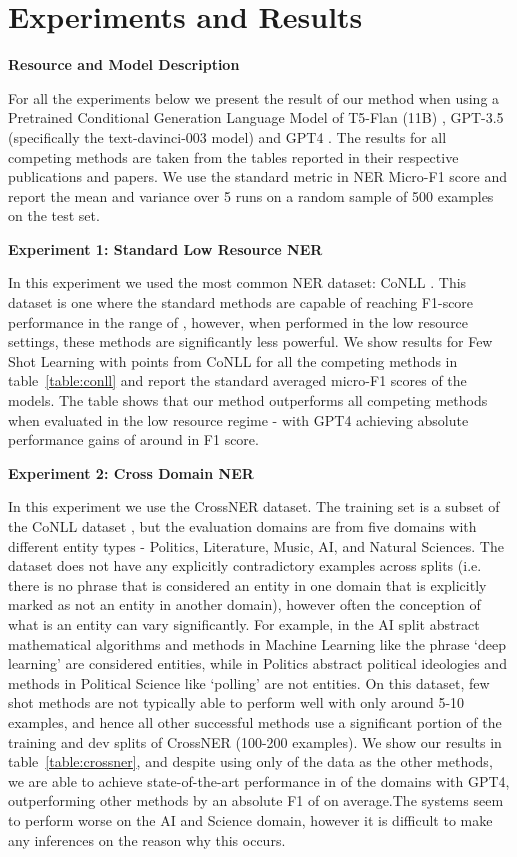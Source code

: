 \documentclass[11pt]{article}
\begin{document}
\section{Experiments and Results}

\noindent\textbf{Resource and Model Description}

For all the experiments below we present the result of our method when using a Pretrained Conditional Generation Language Model of T5-Flan (11B) \citep{chung2022scaling}, GPT-3.5 
 \citep{brown2020language} (specifically the text-davinci-003 model) and GPT4 \citep{openai2023gpt4}. The results for all competing methods are taken from the tables reported in their respective publications and papers. We use the standard metric in NER \citep{de2015survey, wang2022deepstruct} Micro-F1 score and report the mean and variance over 5 runs on a random sample of 500 examples on the test set.

\noindent\textbf{Experiment 1: Standard Low Resource NER}

In this experiment we used the most common NER dataset: CoNLL \citep{sang2003introduction}. This dataset is one where the standard methods are capable of reaching F1-score performance in the range of , \citep{wang2022deepstruct} however, when performed in the low resource settings, these methods are significantly less powerful. We show results for Few Shot Learning with  points from CoNLL for all the competing methods in table~\ref{table:conll} and report the standard averaged micro-F1 scores of the models. The table shows that our method outperforms all competing methods when evaluated in the low resource regime - with GPT4 achieving absolute performance gains of around  in F1 score. 

\noindent\textbf{Experiment 2: Cross Domain NER} 

In this experiment we use the CrossNER \citep{liu2021crossner} dataset. The training set is a subset of the CoNLL dataset \citep{sang2003introduction}, but the evaluation domains are from five domains with different entity types - Politics, Literature, Music, AI, and Natural Sciences. The dataset does not have any explicitly contradictory examples across splits (i.e. there is no phrase that is considered an entity in one domain that is explicitly marked as not an entity in another domain), however often the conception of what is an entity can vary significantly. For example,  in the AI split abstract mathematical algorithms and methods in Machine Learning like the phrase `deep learning' are considered entities, while in Politics abstract political ideologies and methods in Political Science like `polling' are not entities. On this dataset, few shot methods are not typically able to perform well with only around 5-10 examples, and hence all other successful methods use a significant portion of the training and dev splits of CrossNER (100-200 examples). We show our results in table~\ref{table:crossner}, and despite using only  of the data as the other methods, we are able to achieve state-of-the-art performance in  of the domains with GPT4, outperforming other methods by an absolute F1 of  on average.The systems seem to perform worse on the AI and Science domain, however it is difficult to make any inferences on the reason why this occurs. 
\end{document}

